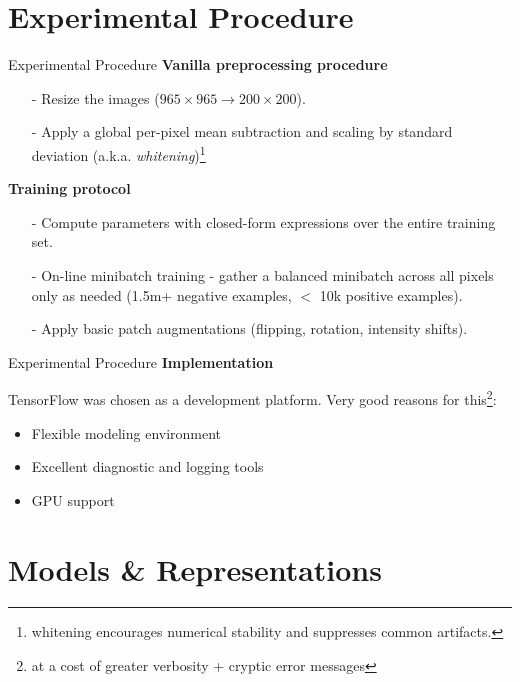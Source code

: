 \documentclass[10pt]{beamer}
\begin{document}
\section{Experimental Procedure}
\begin{frame}{Experimental Procedure}
\textbf{Vanilla preprocessing procedure}
  \begin{itemize}
  	\item[-] Resize the images ($965 \times 965 \rightarrow 200 \times 200$).
  	\item[-] Apply a global per-pixel mean subtraction and scaling by standard deviation (a.k.a. \emph{whitening})\footnote{whitening encourages numerical stability and suppresses common artifacts.}
\end{itemize}

\textbf{Training protocol}
\begin{itemize}
  	\item[-] Compute parameters with closed-form expressions over the entire training set.
  	\item[-] On-line minibatch training - gather a balanced minibatch across all pixels only as needed (1.5m+ negative examples, $<$ 10k positive examples).
  	\item[-] Apply basic patch augmentations (flipping, rotation, intensity shifts).
  \end{itemize}
\end{frame}

\begin{frame}[fragile]{Experimental Procedure}
\textbf{Implementation}

TensorFlow was chosen as a development platform. Very good reasons for this\footnote{at a cost of greater verbosity + cryptic error messages}:
\begin{itemize}
	\item Flexible modeling environment
	\item Excellent diagnostic and logging tools
	\item GPU support
\end{itemize}
\end{frame}


\section{Models \& Representations}
\end{document}
